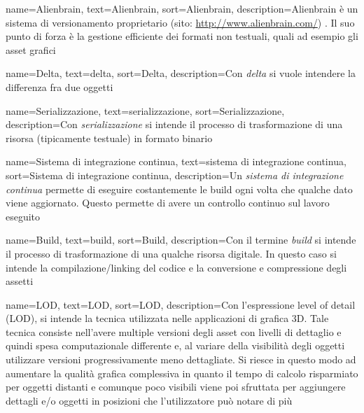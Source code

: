 {
	name=Alienbrain\textsuperscript{\textregistered},
	text=Alienbrain\textsuperscript{\textregistered},
	sort=Alienbrain,
	description={Alienbrain\textsuperscript{\textregistered} è un sistema di versionamento proprietario (sito: \url{http://www.alienbrain.com/}) . Il suo punto di forza è la gestione efficiente dei formati non testuali, quali ad esempio gli asset grafici}
}

{
	name=Delta,
	text=delta,
	sort=Delta,
	description={Con \emph{delta} si vuole intendere la differenza fra due oggetti}
}

{
	name=Serializzazione,
	text=serializzazione,
	sort=Serializzazione,
	description={Con \emph{serializzazione} si intende il processo di trasformazione di una risorsa (tipicamente testuale) in formato binario}
}

{
	name=Sistema di integrazione continua,
	text=sistema di integrazione continua,
	sort=Sistema di integrazione continua,
	description={Un \emph{sistema di integrazione continua} permette di eseguire costantemente le build ogni volta che qualche dato viene aggiornato. Questo permette di avere un controllo continuo sul lavoro eseguito}
}

{
	name=Build,
	text=build,
	sort=Build,
	description={Con il termine \emph{build} si intende il processo di trasformazione di una qualche risorsa digitale. In questo caso si intende la compilazione/linking del codice e la conversione e compressione degli assetti}
}

{
	name=LOD,
	text=LOD,
	sort=LOD,
	description={Con l'espressione level of detail (LOD), si intende la tecnica utilizzata nelle applicazioni di grafica 3D. Tale tecnica consiste nell'avere multiple versioni degli asset con livelli di dettaglio e quindi spesa computazionale differente e, al variare della visibilità degli oggetti utilizzare versioni progressivamente meno dettagliate. Si riesce in questo modo ad aumentare la qualità grafica complessiva in quanto il tempo di calcolo risparmiato per oggetti distanti e comunque poco visibili viene poi sfruttata per aggiungere dettagli e/o oggetti in posizioni che l'utilizzatore può notare di più}
}